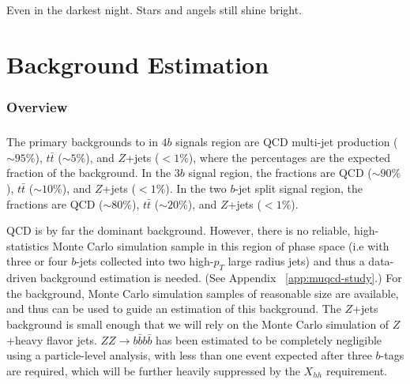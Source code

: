 \begin{savequote}[75mm]
Even in the darkest night. Stars and angels still shine bright.   
\end{savequote}


\chapter{Background Estimation}


\subsection{Overview}
\paragraph{}
The primary backgrounds to in $4b$ signals region are QCD multi-jet production ($\sim 95\%$), $t\bar{t}$ ($\sim 5\%$), and $Z$+jets ($< 1\%$), where the percentages are the expected fraction of the background. 
In the $3b$ signal region, the fractions are QCD ($\sim 90\%$), $t\bar{t}$ ($\sim 10\%$), and $Z$+jets ($< 1\%$).  In the two $b$-jet split signal region, the fractions are QCD ($\sim 80\%$), $t\bar{t}$ ($\sim 20\%$), and $Z$+jets ($< 1\%$).

QCD is by far the dominant background. However, there is no reliable, high-statistics Monte Carlo simulation sample in this region of phase space (i.e with three or four $b$-jets collected into two high-$p_{T}$ large radius jets) and thus a data-driven background estimation is needed. (See Appendix ~\ref{app:muqcd-study}.) For the \ttbar background, Monte Carlo simulation samples of reasonable size are available, and thus can be used to guide an estimation of this background. The $Z$+jets background is small enough that we will rely on the Monte Carlo simulation of $Z$+heavy flavor jets. $ZZ\to b\bar{b}b\bar{b}$ has been estimated to be completely negligible using a particle-level analysis, with less than one event expected after three $b$-tags are required, which will be further heavily suppressed by the $X_{hh}$ requirement.

